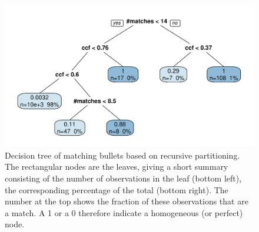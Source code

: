 \documentclass[aoas, preprint]{imsart}\usepackage[]{graphicx}\usepackage[]{color}
\newenvironment{knitrout}{}{} %
\begin{document}
\begin{figure}[hbtp]
  \centering
\begin{knitrout}
\color{fgcolor}
\includegraphics[width=.7\textwidth]{tree-1} 

\end{knitrout}
\caption{\label{fig:tree}Decision tree of matching bullets based on recursive partitioning. The rectangular nodes are the leaves, giving a short summary consisting of the number of observations in the leaf (bottom left), the corresponding percentage of the total (bottom right). The number at the top shows the fraction of these observations that are a match. A 1 or a 0 therefore indicate a homogeneous (or perfect) node. }
\end{figure}
\end{document}
